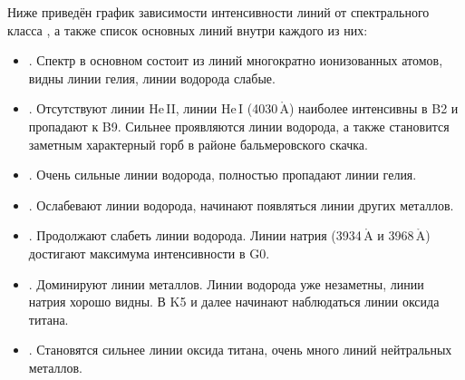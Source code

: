 Ниже приведён график зависимости интенсивности линий от спектрального класса , а также список основных линий внутри каждого из них:

\begin{itemize}
	\item {}. Спектр в основном состоит из линий  многократно ионизованных атомов, видны линии гелия, линии водорода слабые.
	\item {}. Отсутствуют линии He$\,$II, линии He$\,$I (4030$\,\mathring{\text{A}}$) наиболее интенсивны в B2 и пропадают к B9. Сильнее проявляются линии водорода, а также становится заметным характерный горб в районе бальмеровского скачка.
	\item {}. Очень сильные линии водорода, полностью пропадают линии гелия.
	\item {}. Ослабевают линии водорода, начинают появляться линии других металлов. 
	\item {}. Продолжают слабеть линии водорода. Линии натрия (3934$\,\mathring{\text{A}}$ и 3968$\,\mathring{\text{A}}$) достигают максимума интенсивности в G0.
	\item {}. Доминируют линии металлов. Линии водорода уже незаметны, линии натрия хорошо видны. В K5 и далее начинают наблюдаться линии оксида титана.
	\item {}. Становятся сильнее линии оксида титана, очень много линий нейтральных металлов.
\end{itemize}


